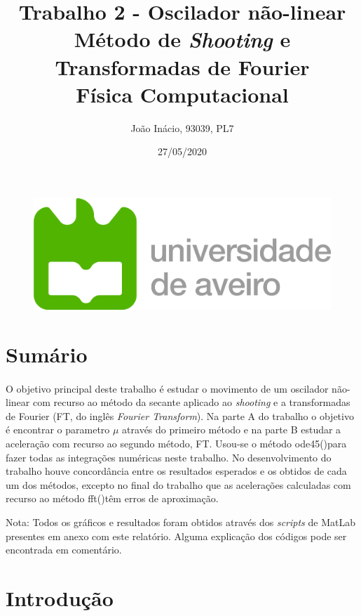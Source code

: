 \documentclass[a4paper, 11pt]{article}
\newcommand{\ode}{{\fontfamily{pcr}\selectfont ode45()}}
\newcommand{\fft}{{\fontfamily{pcr}\selectfont fft()}}
\newcommand{\m}{$\mu$ }
\newcommand{\shooting}{\textit{shooting} }
\newcommand{\Shooting}{\textit{Shooting} }
\begin{document}
	
	\begin{figure}[t]
		\includegraphics[scale=0.2]{Logo_UA}
	\end{figure}

	\title{Trabalho 2 - Oscilador não-linear \\ 
		{\Large Método de \Shooting e Transformadas de Fourier} \\
		{\large Física Computacional}}
	\author{João Inácio, 93039, PL7}
	\date{27/05/2020}
	\maketitle
	
	\section{Sumário}
	\paragraph{}
	O objetivo principal deste trabalho é estudar o movimento de um oscilador não-linear com recurso ao método da secante aplicado ao \shooting e a transformadas de Fourier (FT, do inglês \textit{Fourier Transform}). Na parte A do trabalho o objetivo é encontrar o parametro \m através do primeiro método e na parte B estudar a aceleração com recurso ao segundo método, FT. Usou-se o método \ode para fazer todas as integrações numéricas neste trabalho.
	No desenvolvimento do trabalho houve concordância entre os resultados esperados e os obtidos de cada um dos métodos, excepto no final do trabalho que as acelerações calculadas com recurso ao método \fft têm erros de aproximação.
	
	{\small Nota: Todos os gráficos e resultados foram obtidos através dos \textit{scripts} de MatLab presentes em anexo com este relatório. Alguma explicação dos códigos pode ser encontrada em comentário.}
	\section{Introdução}
\end{document}
